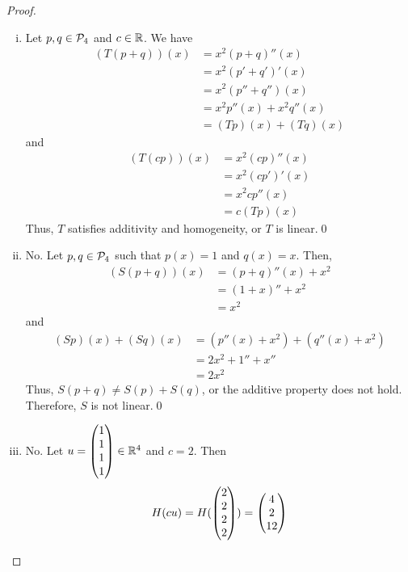 \begin{proof}
    \renewcommand{\qedsymbol}{$\blacksquare$}
    \begin{enumerate}[(i)]
        \item Let $p,q\in\P_4$ and $c\in\R$. We have 
        \[
            \begin{aligned}
                (T(p+q))(x)
                &= x^2(p+q)''(x)\\
                &= x^2(p'+q')'(x)\\
                &= x^2(p''+q'')(x)\\
                &= x^2p''(x)+x^2q''(x)\\
                &= (Tp)(x)+(Tq)(x)
            \end{aligned}
        \]
        and 
        \[
            \begin{aligned}
                (T(cp))(x)
                &= x^2(cp)''(x)\\
                &= x^2(cp')'(x)\\
                &= x^2cp''(x)\\
                &= c(Tp)(x)
            \end{aligned}
        \]
        Thus, $T$ satisfies additivity and homogeneity, or $T$ is linear.\qed
        \item No. Let $p,q\in\P_4$ such that $p(x)=1$ and $q(x)=x$. Then, 
        \[
            \begin{aligned}
                (S(p+q))(x)
                &= (p+q)''(x)+x^2\\
                &= (1+x)''+x^2\\
                &= x^2
            \end{aligned}
        \]
        and 
        \[
            \begin{aligned}
                (Sp)(x)+(Sq)(x)
                &= (p''(x)+x^2)+(q''(x)+x^2)\\
                &= 2x^2+1''+x''\\
                &= 2x^2
            \end{aligned}
        \]
        Thus, $S(p+q)\not=S(p)+S(q)$, or the additive property does not hold. Therefore, $S$ is not linear.\qed
        \item No. Let $u=\ColVecFour{1}{1}{1}{1}\in\R^4$ and $c=2$. Then 
        \[
            \begin{aligned}
                H(cu) = H(\ColVecFour{2}{2}{2}{2}) = \ColVecThree{4}{2}{12}
            \end{aligned}
\]
\end{enumerate}
\end{proof}
